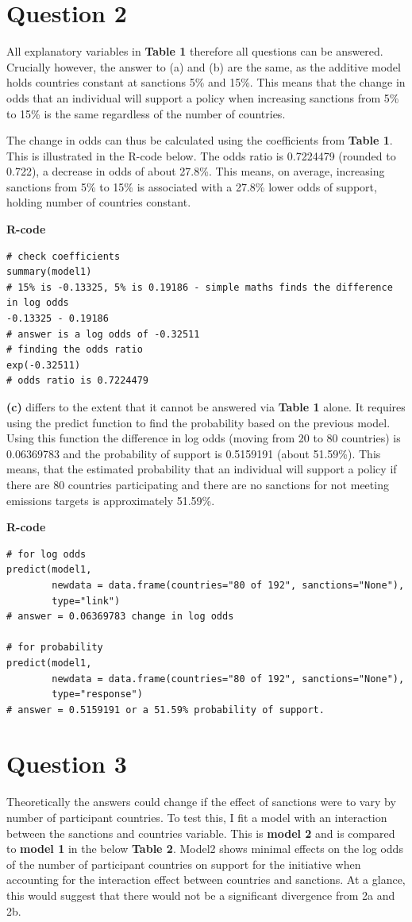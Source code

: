 \documentclass[12pt,letterpaper]{article}
\begin{document}
\section{Question 2}
All explanatory variables in \textbf{Table 1} therefore all questions can be answered. Crucially however, the answer to (a) and (b) are the same, as the additive model holds countries constant at sanctions 5\% and 15\%.  This means that the change in odds that an individual will support a policy when increasing sanctions from 5\% to 15\% is the same regardless of the number of countries.

The change in odds can thus be calculated using the coefficients from \textbf{Table 1}. This is illustrated in the R-code below. The odds ratio is 0.7224479 (rounded to 0.722), a decrease in odds of about 27.8\%. This means, on average, increasing sanctions from 5\% to 15\% is associated with a 27.8\% lower odds of support, holding number of countries constant.

\textbf{R-code}
\begin{verbatim}
# check coefficients
summary(model1)
# 15% is -0.13325, 5% is 0.19186 - simple maths finds the difference in log odds
-0.13325 - 0.19186
# answer is a log odds of -0.32511
# finding the odds ratio
exp(-0.32511)
# odds ratio is 0.7224479
\end{verbatim}

\textbf{(c)} differs to the extent that it cannot be answered via \textbf{Table 1} alone. It requires using the predict function to find the probability based on the previous model. Using this function the difference in log odds (moving from 20 to 80 countries) is 0.06369783 and the probability of support is 0.5159191 (about 51.59\%). This means, that the estimated probability that an individual will support a policy if there are 80 countries participating and there are no sanctions for not meeting emissions targets is approximately 51.59\%.

\textbf{R-code}
\begin{verbatim}
# for log odds
predict(model1,
        newdata = data.frame(countries="80 of 192", sanctions="None"),
        type="link")
# answer = 0.06369783 change in log odds

# for probability
predict(model1,
        newdata = data.frame(countries="80 of 192", sanctions="None"),
        type="response")
# answer = 0.5159191 or a 51.59% probability of support.
\end{verbatim}

\section{Question 3}
Theoretically the answers could change if the effect of sanctions were to vary by number of participant countries. To test this, I fit a model with an interaction between the sanctions and countries variable. This is \textbf{model 2} and is compared to \textbf{model 1} in the below \textbf{Table 2}. Model2 shows minimal effects on the log odds of the number of participant countries on support for the initiative when accounting for the interaction effect between countries and sanctions. At a glance, this would suggest that there would not be a significant divergence from 2a and 2b.
\end{document}
